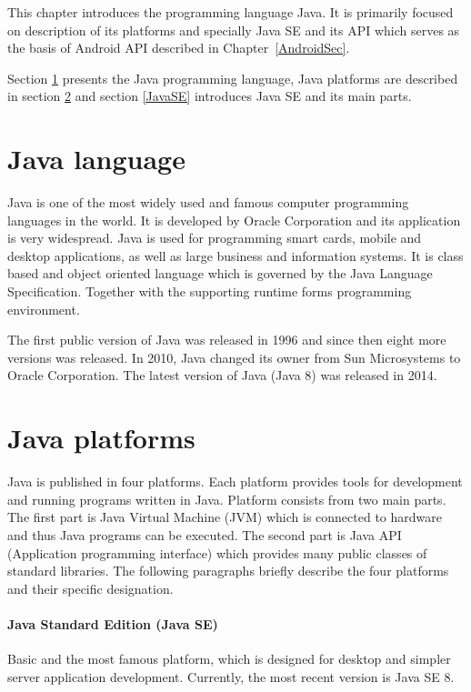 This chapter introduces the programming language Java. It is primarily focused on description of its platforms and specially Java SE and its API which serves as the basis of Android API described in Chapter~\ref{AndroidSec}. 

Section \ref{JavaLang} presents the Java programming language, Java platforms are described in section \ref{JavaPlatforms} and section \ref{JavaSE} introduces Java SE and its main parts.

\section{Java language}\label{JavaLang}
Java \cite{JavaBook} is one of the most widely used and famous computer programming languages in the world. It is developed by Oracle Corporation and its application is very widespread. Java is used for programming smart cards, mobile and desktop applications, as well as large business and information systems. It is class based and object oriented language which is governed by the Java Language Specification. Together with the supporting runtime forms programming environment.

The first public version of Java was released in 1996 and since then eight more versions was released. In 2010, Java changed its owner from Sun Microsystems to Oracle Corporation. The latest version of Java (Java 8) was released in 2014.

\section{Java platforms}\label{JavaPlatforms}
Java is published in four platforms. Each platform provides tools for development and running programs written in Java. Platform consists from two main parts. The first part is Java Virtual Machine (JVM) which is connected to hardware and thus Java programs can be executed. The second part is Java API (Application programming interface) which provides many public classes of standard libraries. The following paragraphs briefly describe the four platforms and their specific designation.

\paragraph{Java Standard Edition (Java SE)}
Basic and the most famous platform, which is designed for desktop and simpler server application development. Currently, the most recent version is Java SE 8.

